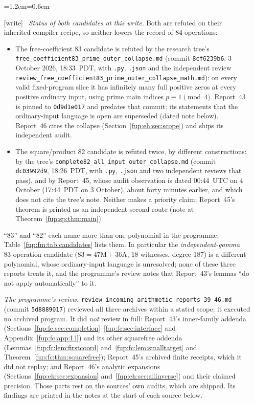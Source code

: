 \documentclass[11pt,letterpaper]{article}
\theoremstyle{definition}\newtheorem{definition}[theorem]{Definition}
\theoremstyle{remark}\newtheorem{remark}[theorem]{Remark}
\newcommand{\wtag}{\textup{[write]}}
\newenvironment{writenote}{\par\smallskip\begin{list}{}{\leftmargin=1.2em\rightmargin=0.6em}\item[]\small\wtag\ }{\end{list}\smallskip}
\newcommand{\rw}[1]{\nolinkurl{#1}}%
\begin{document}
\begin{writenote}
\emph{Status of both candidates at this write.} Both are refuted on their inherited compiler recipe, so neither lowers the record of 84 operations:
\begin{itemize}
\item The free-coefficient 83 candidate is refuted by the research tree's \rw{free_coefficient83_prime_outer_collapse.md} (commit \texttt{8cf6239b6}, 3 October 2026, 18:33~PDT, with \rw{.py}, \rw{.json} and the independent review \rw{review_free_coefficient83_prime_outer_collapse_math.md}): on every valid fixed-program slice it has infinitely many full positive zeros at every positive ordinary input, using prime main indices $p\equiv1\pmod4$. Report~43 is pinned to \texttt{0d9d1e017} and predates that commit; its statements that the ordinary-input language is open are superseded (dated note below). Report~46 cites the collapse (Section~\ref{fup:eh:sec:scope}) and ships its independent audit.
\item The square/product 82 candidate is refuted twice, by different constructions: by the tree's \rw{complete82_all_input_outer_collapse.md} (commit \texttt{dc03992d9}, 18:26~PDT, with \rw{.py}, \rw{.json} and two independent reviews that pass), and by Report~45, whose audit observation is dated 00:44~UTC on 4 October (17:44~PDT on 3 October), about forty minutes earlier, and which does not cite the tree's note. Neither makes a priority claim; Report~45's theorem is printed as an independent second route (note at Theorem~\ref{fup:sp:thm:main}).
\end{itemize}
``83'' and ``82'' each name more than one polynomial in the programme; Table~\ref{fup:fm:tab:candidates} lists them. In particular the \emph{independent-gamma} 83-operation candidate ($83=47\mathrm M+36\mathrm A$, 18 witnesses, degree 187) is a different polynomial, whose ordinary-input language is unresolved; none of these three reports treats it, and the programme's review notes that Report~43's lemmas ``do not apply automatically'' to it.

\emph{The programme's review.} \rw{review_incoming_arithmetic_reports_39_46.md} (commit \texttt{5d8889017}) reviewed all three archives within a stated scope; it executed no archived program. It did \emph{not} review in full: Report~43's inner-family addenda (Sections~\ref{fup:fc:sec:completion}--\ref{fup:fc:sec:interface} and Appendix~\ref{fup:fc:app:11}) and its other squarefree addenda (Lemmas~\ref{fup:fc:lem:firstcoord} and~\ref{fup:fc:lem:smalltarget} and Theorem~\ref{fup:fc:thm:squarefree}); Report~45's archived finite receipts, which it did not replay; and Report~46's analytic expansions (Sections~\ref{fup:eh:sec:expansion} and~\ref{fup:eh:sec:allinverse}) and their claimed precision. Those parts rest on the sources' own audits, which are shipped. Its findings are printed in the notes at the start of each source below.


\end{writenote}
\end{document}
